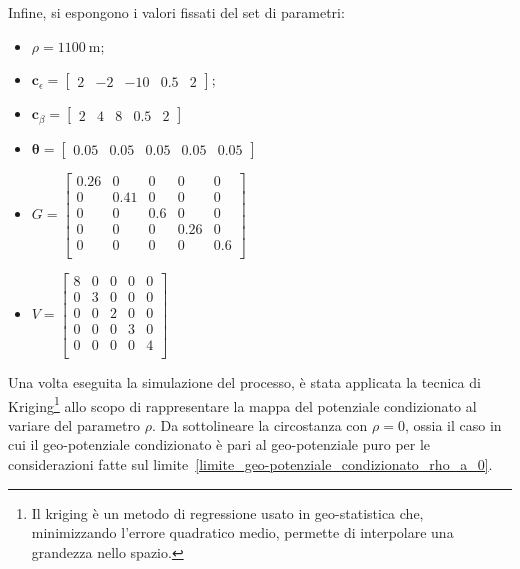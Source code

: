 Infine, si espongono i valori fissati del set di parametri:
\begin{itemize}
	\item $\rho = \SI{1100}{\meter}$;
	\item $\mathbf{c}_\epsilon = \begin{bmatrix} 2 & -2 & -10 & 0.5 & 2 \end{bmatrix}$;
	\item $\mathbf{c}_\beta = \begin{bmatrix} 2 & 4 & 8 & 0.5 & 2 \end{bmatrix}$
	\item $\boldsymbol{\theta} = \begin{bmatrix} 0.05 & 0.05  & 0.05 & 0.05  & 0.05  \end{bmatrix}$
	\item $G = 
	\begin{bmatrix}
		0.26 & 0 & 0 & 0 & 0 \\
		0 & 0.41 & 0 & 0 & 0 \\
		0 & 0 & 0.6 & 0 & 0 \\
		0 & 0 & 0 & 0.26 & 0 \\
		0 & 0 & 0 & 0 & 0.6 \\
	\end{bmatrix}
	$
	\item $V = 
	\begin{bmatrix}
		8 & 0 & 0 & 0 & 0 \\
		0 & 3 & 0 & 0 & 0 \\
		0 & 0 & 2 & 0 & 0 \\
		0 & 0 & 0 & 3 & 0 \\
		0 & 0 & 0 & 0 & 4 \\
	\end{bmatrix}
	$
\end{itemize}
Una volta eseguita la simulazione del processo, è stata applicata la tecnica di Kriging\footnote{Il kriging è un metodo di regressione usato in geo-statistica che, minimizzando l'errore quadratico medio, permette di interpolare una grandezza nello spazio.} allo scopo di rappresentare la mappa del potenziale condizionato al variare del parametro $\rho$. Da sottolineare la circostanza con $\rho = 0$, ossia il caso in cui il geo-potenziale condizionato è pari al geo-potenziale puro per le considerazioni fatte sul limite~\ref{limite_geo-potenziale_condizionato_rho_a_0}.

